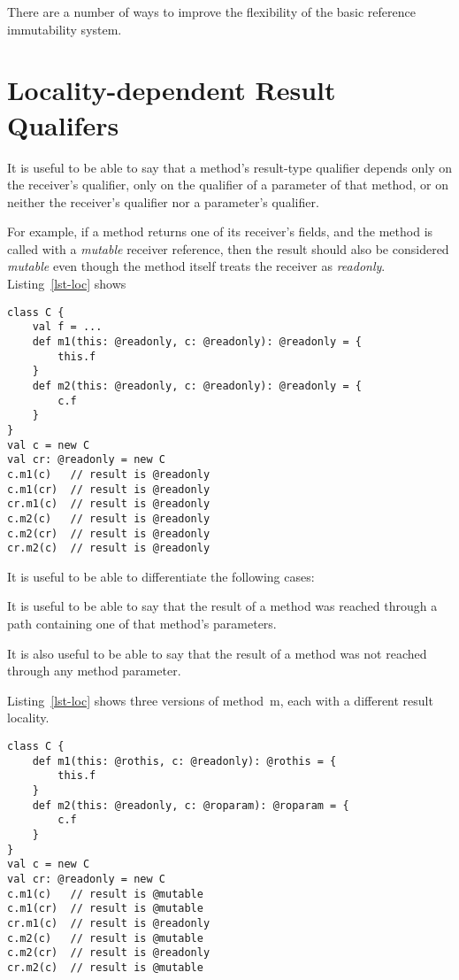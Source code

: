 There are a number of ways to improve the flexibility of the
basic reference immutability system.

\section{Locality-dependent Result Qualifers}

It is useful to be able to say that a method's result-type qualifier
depends only on the receiver's qualifier,
only on the qualifier of a parameter of that method,
or on neither the receiver's qualifier nor a parameter's qualifier.


For example, if a method returns one of its receiver's fields,
and the method is called with a {\em mutable} receiver reference,
then the result should also be considered {\em mutable} even though
the method itself treats the receiver as {\em readonly}.
Listing~\ref{lst-loc} shows

\begin{lstlisting}[caption={Locality-dependent Results},label={lst-loc},float=htp]
class C {
	val f = ...
	def m1(this: @readonly, c: @readonly): @readonly = {
		this.f
	}
	def m2(this: @readonly, c: @readonly): @readonly = {
		c.f
	}
}
val c = new C
val cr: @readonly = new C
c.m1(c)   // result is @readonly
c.m1(cr)  // result is @readonly
cr.m1(c)  // result is @readonly
c.m2(c)   // result is @readonly
c.m2(cr)  // result is @readonly
cr.m2(c)  // result is @readonly
\end{lstlisting}





It is useful to be able to differentiate the following cases:



It is useful to be able to say that the result of a method was reached through
a path containing one of that method's parameters.




It is also useful to be able to say that the result of a method
was not reached through any method parameter.

Listing~\ref{lst-loc} shows three versions of method~{\cd m}, each with a
different result locality.


\begin{lstlisting}[caption={Locality-dependent Results (2)},label={lst-loc-2},float=htp]
class C {
	def m1(this: @rothis, c: @readonly): @rothis = {
		this.f
	}
	def m2(this: @readonly, c: @roparam): @roparam = {
		c.f
	}
}
val c = new C
val cr: @readonly = new C
c.m1(c)   // result is @mutable
c.m1(cr)  // result is @mutable
cr.m1(c)  // result is @readonly
c.m2(c)   // result is @mutable
c.m2(cr)  // result is @readonly
cr.m2(c)  // result is @mutable
\end{lstlisting}

